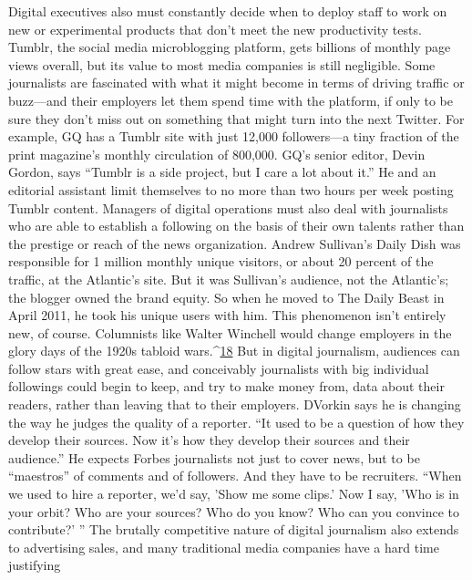 Digital executives also must constantly decide when to deploy staff to work
on new or experimental products that don't meet the new productivity tests.
Tumblr, the social media microblogging platform, gets billions of monthly page
views overall, but its value to most media companies is still negligible. Some
journalists are fascinated with what it might become in terms of driving traffic
or buzz—and their employers let them spend time with the platform, if only to
be sure they don't miss out on something that might turn into the next Twitter.
For example, GQ has a Tumblr site with just 12,000 followers—a tiny fraction of
the print magazine's monthly circulation of 800,000. GQ's senior editor, Devin
Gordon, says ``Tumblr is a side project, but I care a lot about it.'' He and an
editorial assistant limit themselves to no more than two hours per week posting
Tumblr content.
Managers of digital operations must also deal with journalists who are able to
establish a following on the basis of their own talents rather than the prestige or
reach of the news organization. Andrew Sullivan's Daily Dish was responsible
for 1 million monthly unique visitors, or about 20 percent of the traffic, at the
Atlantic's site. But it was Sullivan's audience, not the Atlantic's; the blogger owned
the brand equity. So when he moved to The Daily Beast in April 2011, he took
his unique users with him. This phenomenon isn't entirely new, of course. Columnists
like Walter Winchell would change employers in the glory days of the
1920s tabloid wars.^{\href{#endnotes-chapter-9}{18}} But in digital journalism, audiences can follow stars with
great ease, and conceivably journalists with big individual followings could begin
to keep, and try to make money from, data about their readers, rather than leaving
that to their employers.
DVorkin says he is changing the way he judges the quality of a reporter. ``It
used to be a question of how they develop their sources. Now it's how they develop
their sources and their audience.'' He expects Forbes journalists not just to
cover news, but to be ``maestros'' of comments and of followers. And they have to
be recruiters. ``When we used to hire a reporter, we'd say, 'Show me some clips.'
Now I say, 'Who is in your orbit? Who are your sources? Who do you know?
Who can you convince to contribute?' ''
The brutally competitive nature of digital journalism also extends to advertising
sales, and many traditional media companies have a hard time justifying
